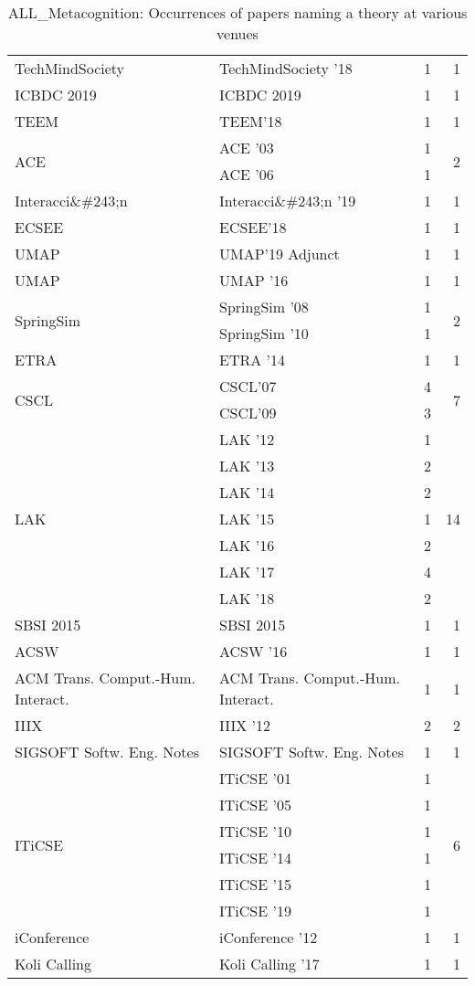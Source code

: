 \begin{table*}[t]
\begin{tabular}{llrr}
\multirow{1}{*}{TechMindSociety } & TechMindSociety '18 & 1 & \multirow{1}{*}{1}\\
\multirow{1}{*}{ICBDC 2019} & ICBDC 2019 & 1 & \multirow{1}{*}{1}\\
\multirow{1}{*}{TEEM} & TEEM'18 & 1 & \multirow{1}{*}{1}\\
\multirow{2}{*}{ACE } & ACE '03 & 1 & \multirow{2}{*}{2}\\
& ACE '06 & 1 &\\
\multirow{1}{*}{Interacci\&\#243;n } & Interacci\&\#243;n '19 & 1 & \multirow{1}{*}{1}\\
\multirow{1}{*}{ECSEE} & ECSEE'18 & 1 & \multirow{1}{*}{1}\\
\multirow{1}{*}{UMAP} & UMAP'19 Adjunct & 1 & \multirow{1}{*}{1}\\
\multirow{1}{*}{UMAP } & UMAP '16 & 1 & \multirow{1}{*}{1}\\
\multirow{2}{*}{SpringSim } & SpringSim '08 & 1 & \multirow{2}{*}{2}\\
& SpringSim '10 & 1 &\\
\multirow{1}{*}{ETRA } & ETRA '14 & 1 & \multirow{1}{*}{1}\\
\multirow{2}{*}{CSCL} & CSCL'07 & 4 & \multirow{2}{*}{7}\\
& CSCL'09 & 3 &\\
\multirow{7}{*}{LAK } & LAK '12 & 1 & \multirow{7}{*}{14}\\
& LAK '13 & 2 &\\
& LAK '14 & 2 &\\
& LAK '15 & 1 &\\
& LAK '16 & 2 &\\
& LAK '17 & 4 &\\
& LAK '18 & 2 &\\
\multirow{1}{*}{SBSI 2015} & SBSI 2015 & 1 & \multirow{1}{*}{1}\\
\multirow{1}{*}{ACSW } & ACSW '16 & 1 & \multirow{1}{*}{1}\\
\multirow{1}{*}{ACM Trans. Comput.-Hum. Interact.} & ACM Trans. Comput.-Hum. Interact. & 1 & \multirow{1}{*}{1}\\
\multirow{1}{*}{IIIX } & IIIX '12 & 2 & \multirow{1}{*}{2}\\
\multirow{1}{*}{SIGSOFT Softw. Eng. Notes} & SIGSOFT Softw. Eng. Notes & 1 & \multirow{1}{*}{1}\\
\multirow{6}{*}{ITiCSE } & ITiCSE '01 & 1 & \multirow{6}{*}{6}\\
& ITiCSE '05 & 1 &\\
& ITiCSE '10 & 1 &\\
& ITiCSE '14 & 1 &\\
& ITiCSE '15 & 1 &\\
& ITiCSE '19 & 1 &\\
\multirow{1}{*}{iConference } & iConference '12 & 1 & \multirow{1}{*}{1}\\
\multirow{1}{*}{Koli Calling } & Koli Calling '17 & 1 & \multirow{1}{*}{1}\\
\end{tabular}
\caption{ALL\_Metacognition: Occurrences of papers naming a theory at various venues}
\end{table*}